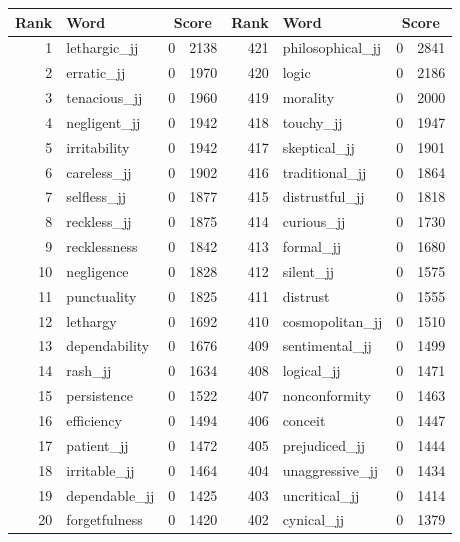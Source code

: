 \begin{table}[tbp]
    \begin{tabular}{| rlr@{.}l | rlr@{.}l |}
    \hline
    \textbf{Rank} & \textbf{Word} & \multicolumn{2}{c|}{\textbf{Score}} & \textbf{Rank} & \textbf{Word} & \multicolumn{2}{c|}{\textbf{Score}} \\
    \hline
    1 & lethargic\_jj & 0 & 2138    &    421 & philosophical\_jj & 0 & 2841 \\
    2 & erratic\_jj & 0 & 1970    &    420 & logic & 0 & 2186 \\
    3 & tenacious\_jj & 0 & 1960    &    419 & morality & 0 & 2000 \\
    4 & negligent\_jj & 0 & 1942    &    418 & touchy\_jj & 0 & 1947 \\
    5 & irritability & 0 & 1942    &    417 & skeptical\_jj & 0 & 1901 \\
    6 & careless\_jj & 0 & 1902    &    416 & traditional\_jj & 0 & 1864 \\
    7 & selfless\_jj & 0 & 1877    &    415 & distrustful\_jj & 0 & 1818 \\
    8 & reckless\_jj & 0 & 1875    &    414 & curious\_jj & 0 & 1730 \\
    9 & recklessness & 0 & 1842    &    413 & formal\_jj & 0 & 1680 \\
    10 & negligence & 0 & 1828    &    412 & silent\_jj & 0 & 1575 \\
    11 & punctuality & 0 & 1825    &    411 & distrust & 0 & 1555 \\
    12 & lethargy & 0 & 1692    &    410 & cosmopolitan\_jj & 0 & 1510 \\
    13 & dependability & 0 & 1676    &    409 & sentimental\_jj & 0 & 1499 \\
    14 & rash\_jj & 0 & 1634    &    408 & logical\_jj & 0 & 1471 \\
    15 & persistence & 0 & 1522    &    407 & nonconformity & 0 & 1463 \\
    16 & efficiency & 0 & 1494    &    406 & conceit & 0 & 1447 \\
    17 & patient\_jj & 0 & 1472    &    405 & prejudiced\_jj & 0 & 1444 \\
    18 & irritable\_jj & 0 & 1464    &    404 & unaggressive\_jj & 0 & 1434 \\
    19 & dependable\_jj & 0 & 1425    &    403 & uncritical\_jj & 0 & 1414 \\
    20 & forgetfulness & 0 & 1420    &    402 & cynical\_jj & 0 & 1379 \\

\end{tabular}
\end{table}
